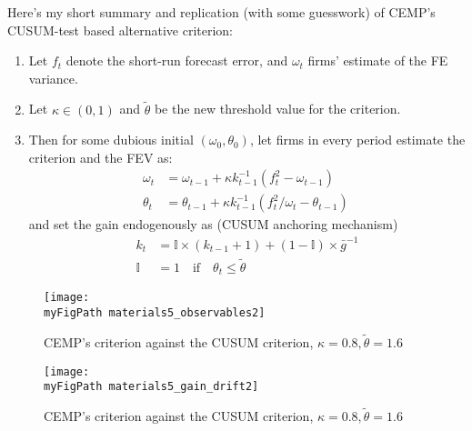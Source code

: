 \documentclass[11pt]{article}
\def \myFigPath {../figures/}
\renewcommand{\[}{\begin{equation}}
\renewcommand{\]}{\end{equation}}
\def\myFigScale{0.3}
\begin{document}
Here's my short summary and replication (with some guesswork) of CEMP's CUSUM-test based alternative criterion:
\begin{enumerate}
\item Let $f_t$ denote the short-run forecast error, and $\omega_t$ firms' estimate of the FE variance.
\item Let $\kappa \in (0,1)$ and $\tilde{\theta}$ be the new threshold value for the criterion.
\item Then for some dubious initial $(\omega_0, \theta_0)$, let firms in every period estimate the criterion and the FEV as:
\begin{align}
 \omega_t & =  \omega_{t-1} + \kappa k_{t-1}^{-1}(f_t^2 -\omega_{t-1})\\
\theta_t & =  \theta_{t-1} + \kappa k_{t-1}^{-1}(f_t^2/\omega_t -\theta_{t-1})\
\end{align}
and set the gain endogenously as (CUSUM anchoring mechanism)
\begin{align}
k_t & = \mathbb{I}\times(k_{t-1}+1) + (1-\mathbb{I}) \times \bar{g}^{-1} \\
\mathbb{I} & = 1 \quad \text{if} \quad  \theta_t \leq \tilde{\theta}
\end{align}
\end{enumerate}


\begin{figure}[h!]
\texttt{[image: \\myFigPath materials5\_observables2]} 
\caption{CEMP's criterion against the CUSUM criterion, $\kappa = 0.8, \tilde{\theta} = 1.6$}
\end{figure}
\begin{figure}[h!]
\texttt{[image: \\myFigPath materials5\_gain\_drift2]} 
\caption{CEMP's criterion against the CUSUM criterion, $\kappa = 0.8, \tilde{\theta} = 1.6$}
\end{figure}
\end{document}
